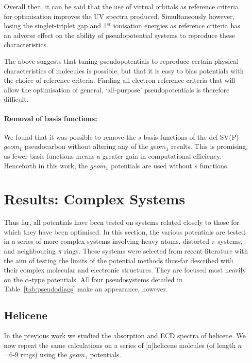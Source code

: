 \documentclass[aip,reprint,nofootinbib]{revtex4-1}
\begin{document}
Overall then, it can be said that the use of virtual orbitals as reference criteria for optimisation improves the UV spectra produced. Simultaneously however, losing the singlet-triplet gap and 1$^{st}$ ionisation energies as reference criteria has an adverse effect on the ability of pseudopotential systems to reproduce these characteristics. 

The above suggests that tuning pseudopotentials to reproduce certain physical characteristics of molecules is possible, but that it is easy to bias potentials with the choice of reference criteria. Finding all-electron reference criteria that will allow the optimisation of general, `all-purpose' pseudopotentials is therefore difficult.

\paragraph{Removal of basis functions:} We found that it was possible to remove the $s$ basis functions of the def-SV(P) $geom_1$ pseudocarbon without altering any of the $geom_1$ results. This is promising, as fewer basis functions means a greater gain in computational efficiency. Henceforth in this work, the $geom_1$ potentials are used without $s$ functions.

\section{Results: Complex Systems}
\label{sec:complexsystems}

Thus far, all potentials have been tested on systems related closely to those for which they have been optimised. In this section, the various potentials are tested in a series of more complex systems involving heavy atoms, distorted $\pi$ systems, and neighbouring $\pi$ rings. These systems were selected from recent literature with the aim of testing the limits of the potential methods thus-far described with their complex molecular and electronic structures. They are focused most heavily on the $\alpha$-type potentials. All four pseudosystems detailed in Table~\ref{tab:pseudodiags} make an appearance, however.

\subsection{Helicene}
\label{sec:helicene}

In the previous work we studied the absorption and ECD spectra of helicene. We now repeat the same calculations on a series of [n]helicene molcules (of length $n$=6-9 rings) using the $geom_1$ potentials.
\end{document}
